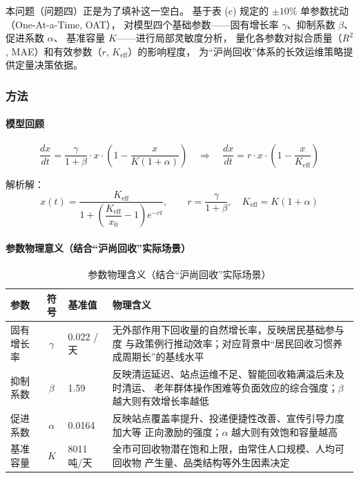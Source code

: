 \documentclass[12pt,a4paper]{ctexart}
\begin{document}
本问题（问题四）正是为了填补这一空白。
基于表 (c) 规定的 $\pm 10\%$ 单参数扰动（One-At-a-Time, OAT）\cite{saltelli}，
对模型四个基础参数——固有增长率 $\gamma$、抑制系数 $\beta$、促进系数 $\alpha$、
基准容量 $K$——进行局部灵敏度分析，
量化各参数对拟合质量（$R^2$, MAE）和有效参数（$r$, $K_{\text{eff}}$）的影响程度，
为``沪尚回收''体系的长效运维策略提供定量决策依据。

\subsubsection{方法}

\paragraph{模型回顾}

\begin{equation}\label{eq:ode_q4}
\frac{dx}{dt} = \frac{\gamma}{1+\beta} \cdot x \cdot \left(1 - \frac{x}{K(1+\alpha)}\right)
\quad\Rightarrow\quad
\frac{dx}{dt} = r \cdot x \cdot \left(1 - \frac{x}{K_{\text{eff}}}\right)
\end{equation}

解析解：
\begin{equation}\label{eq:solution_q4}
x(t) = \frac{K_{\text{eff}}}{1 + \left(\dfrac{K_{\text{eff}}}{x_0} - 1\right) e^{-r t}},\qquad
r = \frac{\gamma}{1+\beta},\quad K_{\text{eff}} = K(1+\alpha)
\end{equation}

\paragraph{参数物理意义（结合``沪尚回收''实际场景）}

\begin{table}[htbp]
\centering
\caption{参数物理含义（结合``沪尚回收''实际场景）}
\label{tab:param_meaning}
\begin{tabular}{lclp{7cm}}
\toprule
参数 & 符号 & 基准值 & 物理含义 \\
\midrule
固有增长率 & $\gamma$ & 0.022 /天 &
  无外部作用下回收量的自然增长率，反映居民基础参与度
  与政策例行推动效率；对应背景中``居民回收习惯养成周期长''的基线水平 \\

抑制系数 & $\beta$ & 1.59 &
  反映清运延迟、站点运维不足、智能回收箱满溢后未及时清运、
  老年群体操作困难等负面效应的综合强度；$\beta$ 越大则有效增长率越低 \\

促进系数 & $\alpha$ & 0.0164 &
  反映站点覆盖率提升、投递便捷性改善、宣传引导力度加大等
  正向激励的强度；$\alpha$ 越大则有效饱和容量越高 \\

基准容量 & $K$ & 8011 吨/天 &
  全市可回收物潜在饱和上限，由常住人口规模、人均可回收物
  产生量、品类结构等外生因素决定 \\
\bottomrule
\end{tabular}
\end{table}
\end{document}

